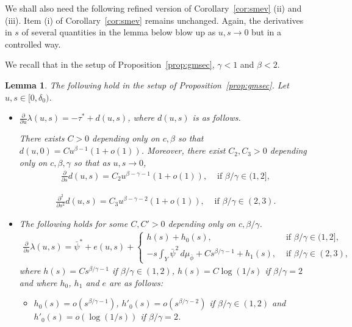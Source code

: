\documentclass[12pt]{article}
\numberwithin{equation}{section}
\newtheorem{lemma}[thm]{Lemma}
\begin{document}
We shall also need the following refined version of Corollary~\ref{cor:smev} (ii) and (iii).
Item (i) of Corollary~\ref{cor:smev} remains unchanged.
Again, the derivatives in $s$ of several quantities in the lemma below blow up as $u,s\to 0$ but in a controlled way.

We recall that in the setup of Proposition~\ref{prop:gmsec}, $\gamma<1$ and $\beta<2$.

\begin{lemma}\label{lemm:refev}
The following hold in the setup of Proposition~\ref{prop:gmsec}.  Let $u, s\in [0,\delta_0)$.
\begin{itemize}
 \item[(i)] $\frac{\partial}{\partial u}\lambda(u,s)=-\tau^*+d(u,s)$, where $d(u,s)$ is as follows.
 
 There exists $C>0$ depending only on $c,\beta$ so that $d(u,0)=
 Cu^{\beta-1}(1+o(1))$.  
 Moreover, there exist $C_2, C_3>0$ depending only on $c,\beta, \gamma$ so that
 as $u,s\to 0$,
 \begin{align*}
 \frac{\partial}{\partial s} d(u,s)=
 C_2 u^{\beta-\gamma-1}(1+o(1)), &\text{ if }\beta/\gamma\in (1,2],
   \end{align*}
 
  \begin{align*}
 \frac{\partial^2}{\partial s^2} d(u,s)=
 C_3 u^{\beta-\gamma-2}(1+o(1)), &\text{ if }\beta/\gamma\in (2,3).
  \end{align*}
  
 
 \item[(ii)] The following holds for some $C, C'>0$ depending only on $c,\beta/\gamma$.
  \begin{align*}
\frac{\partial}{\partial s}\lambda(u,s)=\bar\psi^*+ e(u,s) + \begin{cases}
h(s)+ h_0(s), &\text{ if }\beta/\gamma\in (1,2],\\
 -s\int_Y \bar\psi^2\, d\mu_{\overline{\phi}}+ Cs^{\beta/\gamma-1}+h_1(s), &\text{ if }\beta/\gamma\in (2,3),
 \end{cases}
  \end{align*} 
  where $h(s)=Cs^{\beta/\gamma-1}$ if  $\beta/\gamma\in (1,2)$, $h(s)=C\log(1/s)$ if  $\beta/\gamma=2$
  and where
    $h_0$, $h_1$  and $e$ are as follows: 
 \begin{itemize}
 \item[(a)] $h_0(s)=o(s^{\beta/\gamma-1})$, $h'_0(s)=o(s^{\beta/\gamma-2})$ if $\beta/\gamma\in (1,2)$
 and $h'_0(s)=o(\log(1/s))$ if $\beta/\gamma=2$.
 

\end{itemize}
\end{itemize}
\end{lemma}
\end{document}
